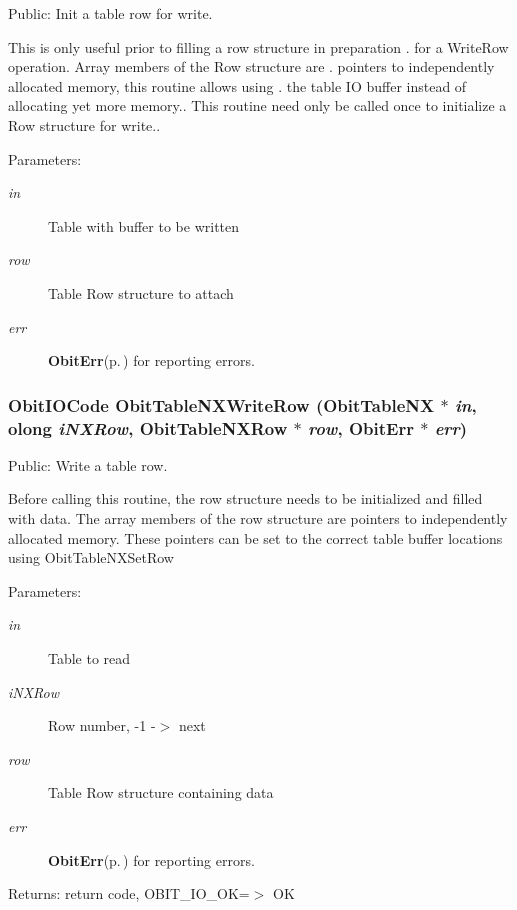 Public: Init a table row for write. 

This is only useful prior to filling a row structure in preparation . for a Write\-Row operation. Array members of the Row structure are . pointers to independently allocated memory, this routine allows using . the table IO buffer instead of allocating yet more memory.. This routine need only be called once to initialize a Row structure for write.. \begin{Desc}
\item[Parameters:]
\begin{description}
\item[{\em in}]Table with buffer to be written \item[{\em row}]Table Row structure to attach \item[{\em err}]{\bf Obit\-Err}{\rm (p.\,\pageref{structObitErr})} for reporting errors. \end{description}
\end{Desc}
\subsubsection{\setlength{\rightskip}{0pt plus 5cm}Obit\-IOCode Obit\-Table\-NXWrite\-Row ({\bf Obit\-Table\-NX} $\ast$ {\em in}, {\bf olong} {\em i\-NXRow}, {\bf Obit\-Table\-NXRow} $\ast$ {\em row}, {\bf Obit\-Err} $\ast$ {\em err})}\label{ObitTableNX_8h_a20}


Public: Write a table row. 

Before calling this routine, the row structure needs to be initialized and filled with data. The array members of the row structure are pointers to independently allocated memory. These pointers can be set to the correct table buffer locations using Obit\-Table\-NXSet\-Row \begin{Desc}
\item[Parameters:]
\begin{description}
\item[{\em in}]Table to read \item[{\em i\-NXRow}]Row number, -1 -$>$ next \item[{\em row}]Table Row structure containing data \item[{\em err}]{\bf Obit\-Err}{\rm (p.\,\pageref{structObitErr})} for reporting errors. \end{description}
\end{Desc}
\begin{Desc}
\item[Returns:]return code, OBIT\_\-IO\_\-OK=$>$ OK \end{Desc}
